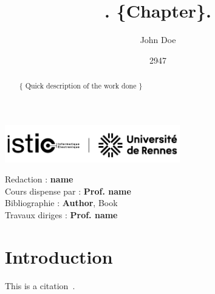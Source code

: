 \documentclass{config/ISTICUR}
\title{\fontfamily{phv}\selectfont . \{Chapter\}.}
\date{2947}
\author{John Doe}
\begin{document}
    \begin{titlepage}
        \maketitle
        \center\includegraphics[width=3in]{assets/logos/ISTIC/PNG/noir}

        \begin{abstract}
            \{
            Quick description of the work done
            \}
        \end{abstract}
        \vspace{5em}

        \newpage

        \tableofcontents

        \vspace{5em}

        \begin{contributors}
            \vspace{.25em}
            Redaction : \textbf{name} \\
            Cours dispense par : \textbf{Prof. name} \\
            Bibliographie : \textbf{Author}, Book\\
            Travaux diriges : \textbf{Prof. name} \\
            \vspace{.25em}
        \end{contributors}

    \end{titlepage}

    \chapter{Introduction}\label{ch:introduction}
    This is a citation~\cite{ahu61}.

    
    
\end{document}
